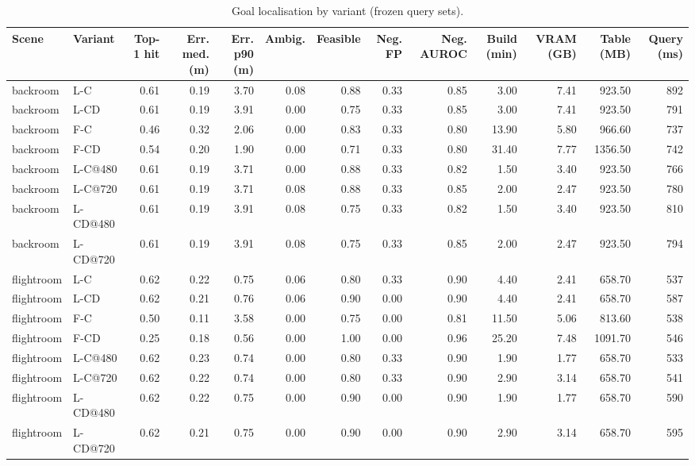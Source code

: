 \begin{table}[ht]
\centering\small
\begin{tabular}{@{}llrrrrrrrrrrr@{}}
\toprule
Scene & Variant & Top-1 hit & Err. med. (m) & Err. p90 (m) & Ambig. & Feasible & Neg. FP & Neg. AUROC & Build (min) & VRAM (GB) & Table (MB) & Query (ms) \\
\midrule
backroom & L-C & 0.61 & 0.19 & 3.70 & 0.08 & 0.88 & 0.33 & 0.85 & 3.00 & 7.41 & 923.50 & 892 \\
backroom & L-CD & 0.61 & 0.19 & 3.91 & 0.00 & 0.75 & 0.33 & 0.85 & 3.00 & 7.41 & 923.50 & 791 \\
backroom & F-C & 0.46 & 0.32 & 2.06 & 0.00 & 0.83 & 0.33 & 0.80 & 13.90 & 5.80 & 966.60 & 737 \\
backroom & F-CD & 0.54 & 0.20 & 1.90 & 0.00 & 0.71 & 0.33 & 0.80 & 31.40 & 7.77 & 1356.50 & 742 \\
backroom & L-C@480 & 0.61 & 0.19 & 3.71 & 0.00 & 0.88 & 0.33 & 0.82 & 1.50 & 3.40 & 923.50 & 766 \\
backroom & L-C@720 & 0.61 & 0.19 & 3.71 & 0.08 & 0.88 & 0.33 & 0.85 & 2.00 & 2.47 & 923.50 & 780 \\
backroom & L-CD@480 & 0.61 & 0.19 & 3.91 & 0.08 & 0.75 & 0.33 & 0.82 & 1.50 & 3.40 & 923.50 & 810 \\
backroom & L-CD@720 & 0.61 & 0.19 & 3.91 & 0.08 & 0.75 & 0.33 & 0.85 & 2.00 & 2.47 & 923.50 & 794 \\
\midrule
flightroom & L-C & 0.62 & 0.22 & 0.75 & 0.06 & 0.80 & 0.33 & 0.90 & 4.40 & 2.41 & 658.70 & 537 \\
flightroom & L-CD & 0.62 & 0.21 & 0.76 & 0.06 & 0.90 & 0.00 & 0.90 & 4.40 & 2.41 & 658.70 & 587 \\
flightroom & F-C & 0.50 & 0.11 & 3.58 & 0.00 & 0.75 & 0.00 & 0.81 & 11.50 & 5.06 & 813.60 & 538 \\
flightroom & F-CD & 0.25 & 0.18 & 0.56 & 0.00 & 1.00 & 0.00 & 0.96 & 25.20 & 7.48 & 1091.70 & 546 \\
flightroom & L-C@480 & 0.62 & 0.23 & 0.74 & 0.00 & 0.80 & 0.33 & 0.90 & 1.90 & 1.77 & 658.70 & 533 \\
flightroom & L-C@720 & 0.62 & 0.22 & 0.74 & 0.00 & 0.80 & 0.33 & 0.90 & 2.90 & 3.14 & 658.70 & 541 \\
flightroom & L-CD@480 & 0.62 & 0.22 & 0.75 & 0.00 & 0.90 & 0.00 & 0.90 & 1.90 & 1.77 & 658.70 & 590 \\
flightroom & L-CD@720 & 0.62 & 0.21 & 0.75 & 0.00 & 0.90 & 0.00 & 0.90 & 2.90 & 3.14 & 658.70 & 595 \\
\bottomrule
\end{tabular}
\caption{Goal localisation by variant (frozen query sets).}
\label{tab:sem-variants}
\end{table}
